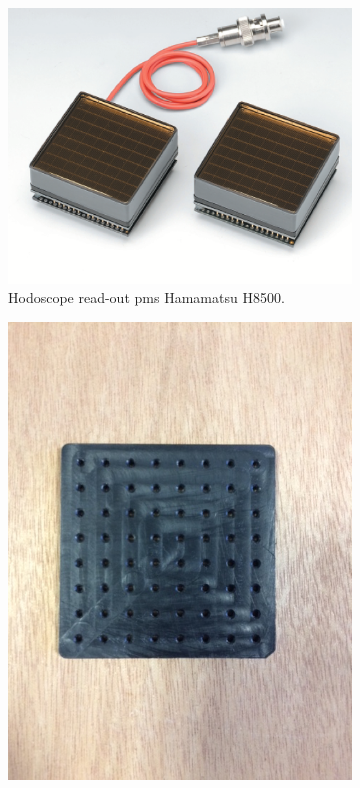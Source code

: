 \begin{figure}
\newline
\begin{subfigure}[t]{0.5\textwidth}
\centering
\includegraphics[width=1\textwidth]{03_GraphicFiles/chapter3_CLaRySproto/Hodoscope/H8500.png}
\caption{Hodoscope read-out \glspl{pm} Hamamatsu H8500.}
\label{chap3::fig::PMH8500}
\end{subfigure}
\begin{subfigure}[t]{.5\textwidth}
\centering
\includegraphics[width=1\textwidth]{03_GraphicFiles/chapter3_CLaRySproto/Hodoscope/Hodoscope_PMmask.JPG}

\end{subfigure}
\end{figure}
